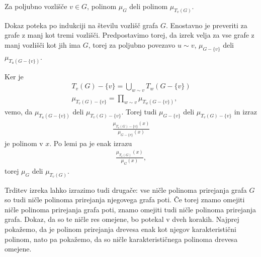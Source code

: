 \begin{izrek}
    Za poljubno vozlišče \(v\in G\), polinom \(\mu_G\) deli polinom \(\mu_{T_v(G)}\).
\end{izrek}
\begin{dokaz}
    Dokaz poteka po indukciji na številu vozlišč grafa \(G\). Enostavno je preveriti za grafe z manj kot tremi vozlišči. Predpostavimo torej, da izrek velja za vse grafe z manj vozlišči kot jih ima \(G\), torej za poljubno povezavo \(u\sim v\), \(\mu_{G-\{v\}}\) deli \(\mu_{T_u(G-\{v\})}\).

    Ker je
    \begin{align*}
        T_v(G) - \{v\} = \bigcup_{w\sim v} T_w(G-\{v\}) \\
        \mu_{T_v(G) - \{v\}} = \prod_{w\sim v} \mu_{T_w(G-\{v\})},
    \end{align*}
    vemo, da \(\mu_{T_u(G-\{v\})}\) deli \(\mu_{T_v(G) - \{v\}}\). Torej tudi \(\mu_{G-\{v\}}\) deli \(\mu_{T_v(G) - \{v\}}\) in izraz
    \begin{align*}
        \frac{\mu_{T_v(G) - \{v\}}(x)}{\mu_{G-\{v\}}(x)}
    \end{align*}
    je polinom v \(x\). Po lemi pa je enak izrazu
    \begin{align*}
        \frac{\mu_{T_v(G)}(x)}{\mu_{G}(x)},
    \end{align*}
    torej \(\mu_G\) deli \(\mu_{T_v(G)}\).
\end{dokaz}

Trditev izreka lahko izrazimo tudi drugače: vse ničle polinoma prirejanja grafa \(G\) so tudi ničle polinoma prirejanja njegovega grafa poti. Če torej znamo omejiti ničle polinoma prirejanja grafa poti, znamo omejiti tudi ničle polinoma prirejanja grafa. Dokaz, da so te ničle res omejene, bo potekal v dveh korakih. Najprej pokažemo, da je polinom prirejanja drevesa enak kot njegov karakteristični polinom, nato pa pokažemo, da so ničle karakterističnega polinoma drevesa omejene.

